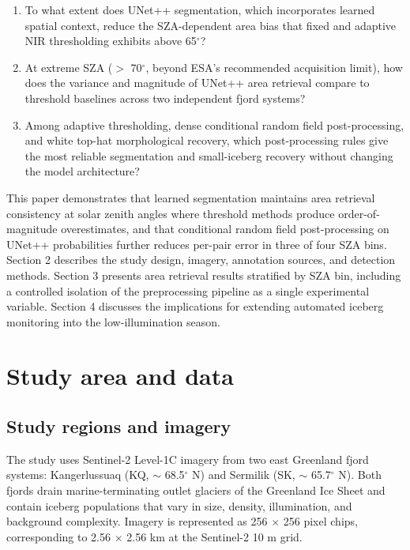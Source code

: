 \documentclass[review,jog]{igs}
\begin{document}
\begin{enumerate}
\item To what extent does UNet++ segmentation, which incorporates learned spatial context, reduce the SZA-dependent area bias that fixed and adaptive NIR thresholding exhibits above 65$^\circ$?
\item At extreme SZA ($>$ 70$^\circ$, beyond ESA's recommended acquisition limit), how does the variance and magnitude of UNet++ area retrieval compare to threshold baselines across two independent fjord systems?
\item Among adaptive thresholding, dense conditional random field post-processing, and white top-hat morphological recovery, which post-processing rules give the most reliable segmentation and small-iceberg recovery without changing the model architecture?
\end{enumerate}

This paper demonstrates that learned segmentation maintains area retrieval consistency at solar zenith angles where threshold methods produce order-of-magnitude overestimates, and that conditional random field post-processing on UNet++ probabilities further reduces per-pair error in three of four SZA bins. Section 2 describes the study design, imagery, annotation sources, and detection methods. Section 3 presents area retrieval results stratified by SZA bin, including a controlled isolation of the preprocessing pipeline as a single experimental variable. Section 4 discusses the implications for extending automated iceberg monitoring into the low-illumination season.


\section{Study area and data}

\subsection{Study regions and imagery}

The study uses Sentinel-2 Level-1C imagery from two east Greenland fjord systems: Kangerlussuaq (KQ, $\sim$ 68.5$^\circ$ N) and Sermilik (SK, $\sim$ 65.7$^\circ$ N). Both fjords drain marine-terminating outlet glaciers of the Greenland Ice Sheet and contain iceberg populations that vary in size, density, illumination, and background complexity. Imagery is represented as 256 $\times$ 256 pixel chips, corresponding to 2.56 $\times$ 2.56 km at the Sentinel-2 10 m grid.
\end{document}
